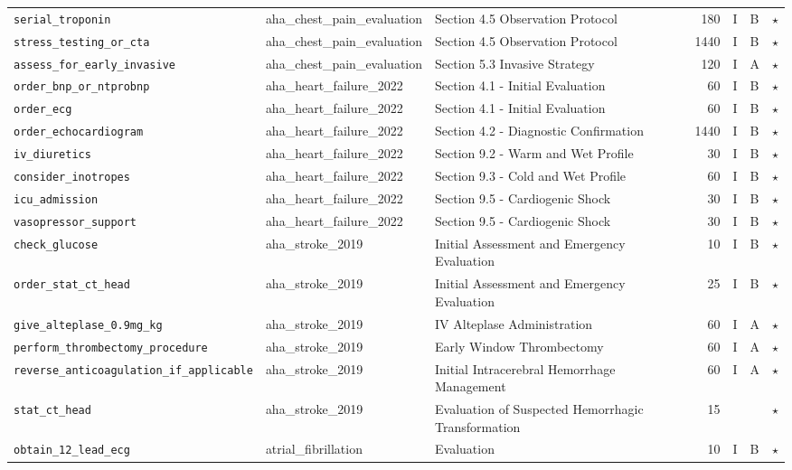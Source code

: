\begin{longtable}{lllrcll}
\texttt{serial\_troponin} & aha\_chest\_pain\_evaluation & Section 4.5 Observation Protocol & 180 & I & B & $\star$ \\
\texttt{stress\_testing\_or\_cta} & aha\_chest\_pain\_evaluation & Section 4.5 Observation Protocol & 1440 & I & B & $\star$ \\
\texttt{assess\_for\_early\_invasive} & aha\_chest\_pain\_evaluation & Section 5.3 Invasive Strategy & 120 & I & A & $\star$ \\
\texttt{order\_bnp\_or\_ntprobnp} & aha\_heart\_failure\_2022 & Section 4.1 - Initial Evaluation & 60 & I & B & $\star$ \\
\texttt{order\_ecg} & aha\_heart\_failure\_2022 & Section 4.1 - Initial Evaluation & 60 & I & B & $\star$ \\
\texttt{order\_echocardiogram} & aha\_heart\_failure\_2022 & Section 4.2 - Diagnostic Confirmation & 1440 & I & B & $\star$ \\
\texttt{iv\_diuretics} & aha\_heart\_failure\_2022 & Section 9.2 - Warm and Wet Profile & 30 & I & B & $\star$ \\
\texttt{consider\_inotropes} & aha\_heart\_failure\_2022 & Section 9.3 - Cold and Wet Profile & 60 & I & B & $\star$ \\
\texttt{icu\_admission} & aha\_heart\_failure\_2022 & Section 9.5 - Cardiogenic Shock & 30 & I & B & $\star$ \\
\texttt{vasopressor\_support} & aha\_heart\_failure\_2022 & Section 9.5 - Cardiogenic Shock & 30 & I & B & $\star$ \\
\texttt{check\_glucose} & aha\_stroke\_2019 & Initial Assessment and Emergency Evaluation & 10 & I & B & $\star$ \\
\texttt{order\_stat\_ct\_head} & aha\_stroke\_2019 & Initial Assessment and Emergency Evaluation & 25 & I & B & $\star$ \\
\texttt{give\_alteplase\_0.9mg\_kg} & aha\_stroke\_2019 & IV Alteplase Administration & 60 & I & A & $\star$ \\
\texttt{perform\_thrombectomy\_procedure} & aha\_stroke\_2019 & Early Window Thrombectomy & 60 & I & A & $\star$ \\
\texttt{reverse\_anticoagulation\_if\_applicable} & aha\_stroke\_2019 & Initial Intracerebral Hemorrhage Management & 60 & I & A & $\star$ \\
\texttt{stat\_ct\_head} & aha\_stroke\_2019 & Evaluation of Suspected Hemorrhagic Transformation & 15 &  &  & $\star$ \\
\texttt{obtain\_12\_lead\_ecg} & atrial\_fibrillation & Evaluation & 10 & I & B & $\star$ \\

\end{longtable}
